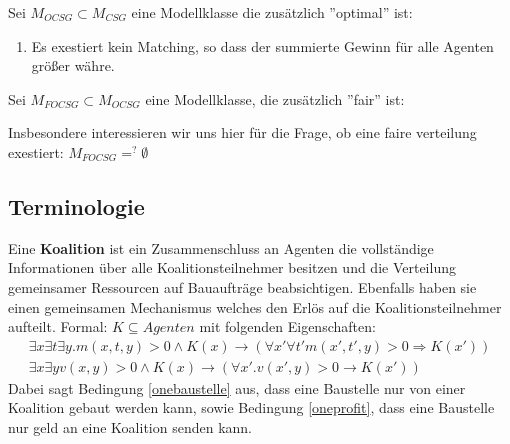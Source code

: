 %

Sei $M_{OCSG} \subset M_{CSG}$ eine Modellklasse die zusätzlich ''optimal'' ist:
\begin{enumerate}
  \item Es exestiert kein Matching, so dass der summierte Gewinn für alle Agenten größer währe.
\end{enumerate}

Sei $M_{FOCSG}\subset M_{OCSG}$ eine Modellklasse, die zusätzlich ''fair'' ist:

Insbesondere interessieren wir uns hier für die Frage, ob eine faire verteilung exestiert: $M_{FOCSG} =^? \emptyset$

\subsection{Terminologie}
\label{sigmod}

\begin{definition}[Koalition]
  Eine \textbf{Koalition} ist ein Zusammenschluss an Agenten die vollständige Informationen über alle Koalitionsteilnehmer besitzen und die Verteilung gemeinsamer Ressourcen auf Bauaufträge beabsichtigen. Ebenfalls haben sie einen gemeinsamen Mechanismus welches den Erlös auf die Koalitionsteilnehmer aufteilt. Formal: $K\subseteq Agenten$ mit folgenden Eigenschaften:
  \begin{align}
    \exists x\exists t\exists y. m(x,t,y) > 0 \land K(x)\rightarrow (\forall x'\forall t' m(x',t',y) > 0\Rightarrow K(x')) \label{onebaustelle} \\
    \exists x\exists y v(x,y) > 0 \land K(x) \rightarrow (\forall x'.v(x', y) > 0 \rightarrow K(x')) \label{oneprofit}
  \end{align}
  Dabei sagt Bedingung \ref{onebaustelle} aus, dass eine Baustelle nur von einer Koalition gebaut werden kann, sowie Bedingung \ref{oneprofit}, dass eine Baustelle nur geld an eine Koalition senden kann.
\end{definition}

